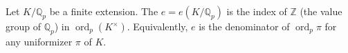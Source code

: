 Let $K/\mathbb{Q}_p$ be a finite extension. The  $e = e(K/\mathbb{Q}_p)$ is the index of $\mathbb{Z}$ (the value group of $\mathbb{Q}_p$) in $\operatorname{ord}_p(K^\times)$. Equivalently, $e$ is the denominator of $\operatorname{ord}_p \pi$ for any uniformizer $\pi$ of $K$.